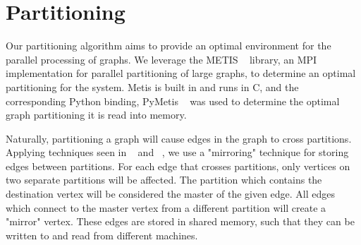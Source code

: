 \section{Partitioning}
\label{sec:partition}

Our partitioning algorithm aims to provide an optimal environment
for the parallel processing of graphs. We leverage the METIS
~\cite{Lasalle:2013:metis} library, an MPI implementation for parallel
partitioning of large graphs, to determine an optimal partitioning for the system.
Metis is built in and runs in C, and the corresponding Python binding, PyMetis ~\cite{pymetis}
was used to determine the optimal graph partitioning it is read into memory.


Naturally, partitioning a graph will cause edges in the graph to cross 
partitions. Applying techniques seen in ~\cite{Tian:2013:thinklikeagraph} and 
~\cite{Chen:2015:powerlyra}, we use a "mirroring" technique for storing edges
between partitions. For each edge that crosses partitions, only vertices on 
two separate partitions will be affected. The partition which contains the 
destination vertex will be considered the master of the given edge. All edges 
which connect to the master vertex from a different partition will create a
"mirror" vertex. These edges are stored in shared memory, such that they can
be written to and read from different machines.


